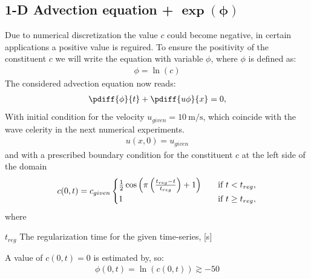 \subsection{1-D Advection equation + $\mathbf{\exp(\phi)}$}
Due to numerical discretization the value $c$ could become negative, in certain applications a positive value is reguired.
To ensure the positivity of the constituent $c$ we will write the equation with variable $\phi$, where $\phi$ is defined as:
\begin{align}
    \phi = \ln(c)
\end{align}
The considered advection equation now reads:
\begin{align}
    \pdiff{\phi}{t} + \pdiff{u\phi}{x} = 0,\label{eq:1d_advec_phi}
\end{align}
With initial condition for the velocity $u_{given} = \SI{10}{\metre\per\second}$, which coincide with the wave celerity in the next numerical experiments.
\begin{align}
    u(x,0) = u_{given}
\end{align}
and with a prescribed boundary condition for the constituent $c$ at the left side of the domain
\begin{align}
    c(0,t) = c_{given}
    \begin{cases}
        \frac{1}{2} \cos\left(\pi \left(\frac{t_{reg} - t}{t_{reg}}\right)+ 1\right) &\quad \text{if } t < t_{reg},
        \\
        1 &\quad \text{if } t \geq t_{reg},
    \end{cases}
\end{align}
where
\begin{symbollist}
    \item[$t_{reg}$] The regularization time for the given time-series, [\si{\second}]
\end{symbollist}
A value of $c(0,t)=0$ is estimated by, so:
\begin{align}
    \phi(0,t) = \ln(c(0,t)) \gtrsim -50
\end{align}
